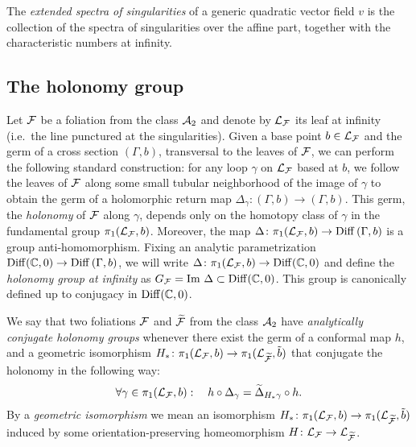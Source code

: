 \documentclass[phd,tocprelim]{cornell}
\begin{document}
\begin{definition}\label{def:extendedSpectra}
 The \textit{extended spectra of singularities} of a generic quadratic vector field $v$ is the collection of the spectra of singularities over the affine part, together with the characteristic numbers at infinity.
\end{definition}


\subsection{The holonomy group}

Let $\mathcal{F}$ be a foliation from the class $\mathcal{A}_2$ and denote by $\mathcal{L}_{\mathcal{F}}$ its leaf at infinity (i.e.~the line punctured at the singularities). Given a base point $b\in\mathcal{L}_{\mathcal{F}}$ and the germ of a cross section $(\Gamma,b)$, transversal to the leaves of $\mathcal{F}$, we can perform the following standard construction: for any loop $\gamma$ on $\mathcal{L}_{\mathcal{F}}$ based at $b$, we follow the leaves of $\mathcal{F}$ along some small tubular neighborhood of the image of $\gamma$ to obtain the germ of a holomorphic return map $\Delta_\gamma\colon (\Gamma,b)\to(\Gamma,b)$. This germ, the \textit{holonomy} of $\mathcal{F}$ along $\gamma$, depends only on the homotopy class of $\gamma$ in the fundamental group $\pi_1(\mathcal{L}_{\mathcal{F}},b)$. Moreover, the map $\Delta\colon\pi_1(\mathcal{L}_{\mathcal{F}},b)\to \operatorname{Diff}\,(\Gamma,b)$ is a group anti-homomorphism. Fixing an analytic parametrization $\operatorname{Diff}(\mathbb{C},0)\to \operatorname{Diff}\,(\Gamma,b)$, we will write $\Delta\colon\pi_1(\mathcal{L}_{\mathcal{F}},b)\to\operatorname{Diff}(\mathbb{C},0)$ and define the \textit{holonomy group at infinity} as $G_{\mathcal{F}}=\operatorname{Im}\,\Delta\subset\operatorname{Diff}(\mathbb{C},0)$. This group is canonically defined up to conjugacy in $\operatorname{Diff}(\mathbb{C},0)$.

\begin{definition}
 We say that two foliations $\mathcal{F}$ and $\widetilde{\mathcal{F}}$ from the class $\mathcal{A}_2$ have \textit{analytically conjugate holonomy groups} whenever there exist the germ of a conformal map $h$, and a geometric isomorphism $H_{\ast}\colon \pi_1(\mathcal{L}_{\mathcal{F}},b)\to\pi_1(\mathcal{L}_{\widetilde{\mathcal{F}}},\tilde{b})$ that conjugate the holonomy in the following way:
  \[ \forall\gamma\in\pi_1(\LF,b): \quad %
     h\circ\Delta_\gamma = \widetilde{\Delta}_{H_{\ast}\gamma}\circ h. \]
By a \textit{geometric isomorphism} we mean an isomorphism $H_{\ast}\colon \pi_1(\mathcal{L}_{\mathcal{F}},b)\to\pi_1(\mathcal{L}_{\widetilde{\mathcal{F}}},\tilde{b})$ induced by some orientation-preserving homeomorphism $H\colon\mathcal{L}_{\mathcal{F}}\to\mathcal{L}_{\widetilde{\mathcal{F}}}$.
\end{definition}
\end{document}
